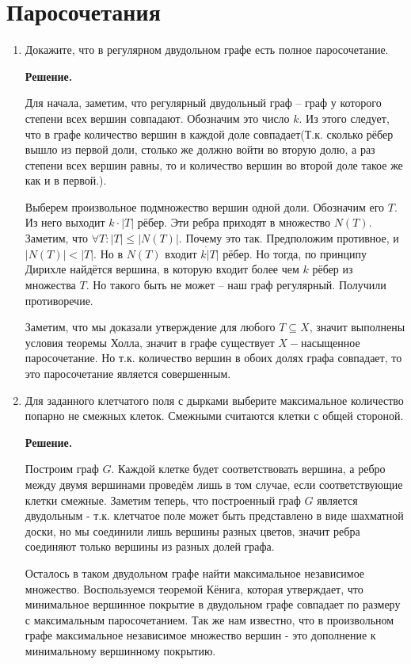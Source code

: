 \section{Паросочетания}
\begin{enumerate}
	\item Докажите, что в регулярном двудольном графе есть полное паросочетание.
	
	\textbf{Решение.} 
	
	Для начала, заметим, что регулярный двудольный граф -- граф у которого степени всех вершин совпадают. Обозначим 
	это число $k$. Из этого следует, что в графе количество вершин в каждой доле совпадает(Т.к. сколько рёбер вышло 
	из первой доли, столько же должно войти во вторую долю, а раз степени всех вершин равны, то и количество 
	вершин во второй доле такое же как и в первой.).
	
	Выберем произвольное подмножество вершин одной доли. Обозначим его $T$. Из него выходит $k \cdot |T|$ рёбер.
	Эти ребра приходят в множество $N(T)$. Заметим, что $\forall T: |T|\leqslant |N(T)|$. Почему это так. 
	Предположим противное, и $|N(T)| < |T|$. Но в $N(T)$ входит $k \dot |T|$ рёбер. Но тогда, по принципу Дирихле 
	найдётся вершина, в которую входит более чем $k$ рёбер из множества $T$. Но такого быть не может -- наш 
	граф регулярный. Получили противоречие. 
	
	Заметим, что мы доказали утверждение для любого $T \subseteq X$, значит выполнены условия теоремы Холла, 
	значит в графе существует $X-$насыщенное паросочетание. Но т.к. количество вершин в обоих долях графа 
	совпадает, то это паросочетание является совершенным.
	
	\item Для заданного клетчатого поля с дырками выберите максимальное количество попарно не смежных клеток. 
	Смежными считаются клетки с общей стороной.
	
	\textbf{Решение.}
	
	Построим граф $G$. Каждой клетке будет соответствовать вершина, а ребро между двумя вершинами проведём лишь в 
	том случае, если соответствующие клетки смежные. Заметим теперь, что построенный граф $G$ является двудольным 
	- т.к. клетчатое поле может быть представлено в виде шахматной доски, но мы соединили лишь вершины разных 
	цветов, значит ребра соединяют только вершины из разных долей графа.
	
	Осталось в таком двудольном графе найти максимальное независимое множество. Воспользуемся теоремой Кёнига, 
	которая утверждает, что минимальное вершинное покрытие в двудольном графе совпадает по размеру с максимальным 
	паросочетанием. Так же нам известно, что в произвольном графе максимальное независимое множество вершин - это 
	дополнение к минимальному вершинному покрытию.
	

\end{enumerate}
